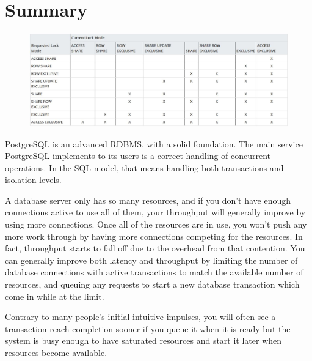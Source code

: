 \documentclass[paper=letter, fontsize=12pt]{article}
\begin{document}
\pagebreak
\section{Summary}
\begin{figure}[h]
	\setlength{\parindent}{-10em} 
	\includegraphics[width=600px]{assets/conflict-lock}
\end{figure}
PostgreSQL is an advanced RDBMS, with a solid foundation. The main service PostgreSQL implements to its users is a correct handling of concurrent operations. In the SQL model, that means handling both transactions and isolation levels.

A database server only has so many resources, and if you don't have enough connections active to use all of them, your throughput will generally improve by using more connections. Once all of the resources are in use, you won't push any more work through by having more connections competing for the resources. In fact, throughput starts to fall off due to the overhead from that contention. You can generally improve both latency and throughput by limiting the number of database connections with active transactions to match the available number of resources, and queuing any requests to start a new database transaction which come in while at the limit.

Contrary to many people's initial intuitive impulses, you will often see a transaction reach completion sooner if you queue it when it is ready but the system is busy enough to have saturated resources and start it later when resources become available. 
\end{document}
